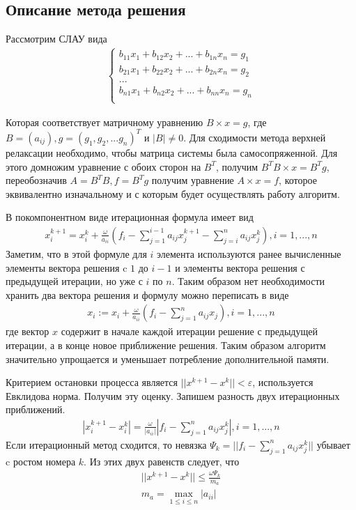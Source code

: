 \documentclass[a4paper,12pt,titlepage,finall]{article}
\begin{document}
\subsection{Описание метода решения}
Рассмотрим СЛАУ вида
\begin{align*}
\begin{cases}
b_{11} x_1 + b_{12} x_2 + ... + b_{1n} x_n = g_1\\
b_{21} x_1 + b_{22} x_2 + ... + b_{2n} x_n = g_2\\
...\\
b_{n1} x_1 + b_{n2} x_2 + ... + b_{nn} x_n = g_n\\
\end{cases}
\end{align*}
\par
Которая соответствует матричному уравнению $B \times x = g$, где $B = (a_{ij}), g = (g_1, g_2, ... g_n)^T$ и $|B| \neq 0$. Для сходимости метода верхней релаксации необходимо, чтобы матрица системы была самосопряженной. Для этого домножим уравнение с обоих сторон на $B^T$, получим $B^T B \times x = B^T g$, переобозначив $A = B^T B, f = B^T g$ получим уравнение $A \times x = f$, которое эквивалентно изначальному и с которым будет осуществлять работу алгоритм.
\par
В покомпонентном виде итерационная формула имеет вид
\begin{align*}
x^{k+1}_i = x^k_i + \frac{\omega}{a_{ii}}\left(f_i - \sum\limits^{i-1}_{j=1}a_{ij}x^{k+1}_j - \sum\limits^{n}_{j=i}a_{ij}x^{k}_j\right), i = 1,...,n
\end{align*}
Заметим, что в этой формуле для $i$ элемента используются ранее вычисленные элементы вектора решения c $1$ до $i-1$ и элементы вектора решения с предыдущей итерации, но уже с $i$ по $n$. Таким образом нет необходимости хранить два вектора решения и формулу можно переписать в виде
\begin{align*}
x_i := x_i + \frac{\omega}{a_{ii}}\left(f_i - \sum\limits^{n}_{j=1}a_{ij}x_j\right), i = 1,...,n
\end{align*}
где вектор $x$ содержит в начале каждой итерации решение с предыдущей итерации, а в конце новое приближение решения. Таким образом алгоритм значительно упрощается и уменьшает потребление дополнительной памяти.
\par
Критерием остановки процесса является $||x^{k+1} - x^{k}|| < \varepsilon$, используется Евклидова норма. Получим эту оценку. Запишем разность двух итерационных приближений.
\begin{align*}
|x^{k+1}_i - x^k_i| = \frac{\omega}{|a_{ii}|} | f_i - \sum\limits^{n}_{j=1}a_{ij}x^k_j|, i = 1,...,n
\end{align*}
Если итерационный метод сходится, то невязка $\Psi_k = ||f_i - \sum\limits^{n}_{j=1}a_{ij}x^k_j||$ убывает c ростом номера $k$. Из этих двух равенств следует, что
\begin{align*}
||x^{k+1} - x^{k}|| \leq \frac{\omega \Psi_k}{m_a}\\
m_a = \max\limits_{1 \leq i \leq n} |a_{ii}|
\end{align*}
\end{document}
